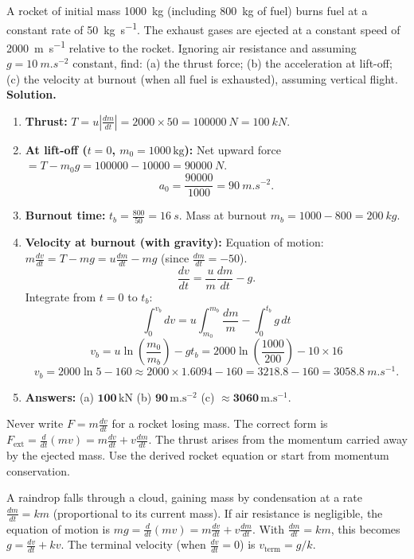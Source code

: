 \documentclass[11pt]{article}
\begin{document}
\begin{exoresolu}
A rocket of initial mass \SI{1000}{kg} (including \SI{800}{kg} of fuel) burns fuel at a constant rate of \SI{50}{kg.s^{-1}}. The exhaust gases are ejected at a constant speed of \SI{2000}{m.s^{-1}} relative to the rocket. Ignoring air resistance and assuming $g = \SI{10}{m.s^{-2}}$ constant, find: (a) the thrust force; (b) the acceleration at lift-off; (c) the velocity at burnout (when all fuel is exhausted), assuming vertical flight.
\tcblower
\textbf{Solution.}
\begin{enumerate}
    \item \textbf{Thrust:} $T = u \left|\frac{dm}{dt}\right| = 2000 \times 50 = \SI{100000}{N} = \SI{100}{kN}$.
    \item \textbf{At lift-off ($t=0$, $m_0 = 1000\,\mathrm{kg}$):} Net upward force $= T - m_0g = 100000 - 10000 = \SI{90000}{N}$.
    \[
    a_0 = \frac{90000}{1000} = \SI{90}{m.s^{-2}}.
    \]
    \item \textbf{Burnout time:} $t_b = \frac{800}{50} = \SI{16}{s}$. Mass at burnout $m_b = 1000 - 800 = \SI{200}{kg}$.
    \item \textbf{Velocity at burnout (with gravity):} Equation of motion: $m\frac{dv}{dt} = T - mg = u\frac{dm}{dt} - mg$ (since $\frac{dm}{dt} = -50$).
    \[
    \frac{dv}{dt} = \frac{u}{m}\frac{dm}{dt} - g.
    \]
    Integrate from $t=0$ to $t_b$:
    \[
    \int_0^{v_b} dv = u \int_{m_0}^{m_b} \frac{dm}{m} - \int_0^{t_b} g\,dt
    \]
    \[
    v_b = u \ln\left(\frac{m_0}{m_b}\right) - g t_b = 2000 \ln\left(\frac{1000}{200}\right) - 10 \times 16
    \]
    \[
    v_b = 2000 \ln 5 - 160 \approx 2000 \times 1.6094 - 160 = 3218.8 - 160 = \SI{3058.8}{m.s^{-1}}.
    \]
    \item \textbf{Answers:} (a) $\boldsymbol{100\,\mathrm{kN}}$ (b) $\boldsymbol{90\,\mathrm{m.s^{-2}}}$ (c) $\boldsymbol{\approx 3060\,\mathrm{m.s^{-1}}}$.
\end{enumerate}
\begin{attention}
Never write $F = m\frac{dv}{dt}$ for a rocket losing mass. The correct form is $F_{\text{ext}} = \frac{d}{dt}(mv) = m\frac{dv}{dt} + v\frac{dm}{dt}$. The thrust arises from the momentum carried away by the ejected mass. Use the derived rocket equation or start from momentum conservation.
\end{attention}
\end{exoresolu}

\begin{experience}
A raindrop falls through a cloud, gaining mass by condensation at a rate $\frac{dm}{dt} = km$ (proportional to its current mass). If air resistance is negligible, the equation of motion is $mg = \frac{d}{dt}(mv) = m\frac{dv}{dt} + v\frac{dm}{dt}$. With $\frac{dm}{dt}=km$, this becomes $g = \frac{dv}{dt} + kv$. The terminal velocity (when $\frac{dv}{dt}=0$) is $v_{\text{term}} = g/k$.
\end{experience}
\end{document}
